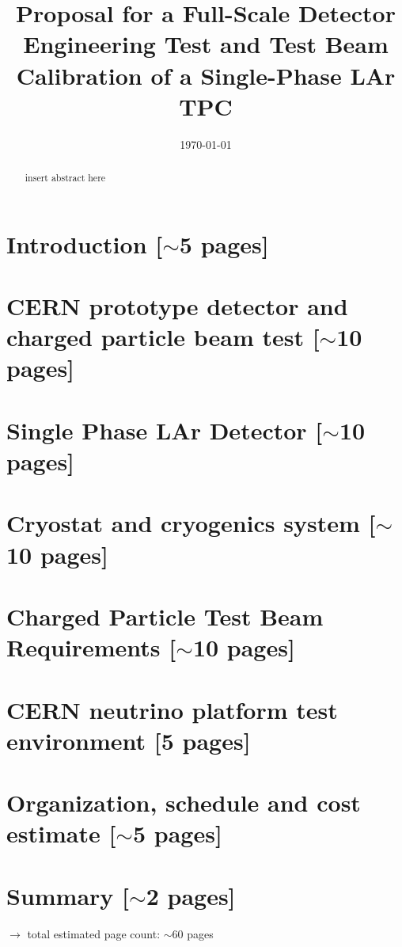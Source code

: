 \documentclass[12pt]{article}
\begin{document}
\title{  Proposal for a Full-Scale Detector Engineering Test and Test Beam Calibration of a Single-Phase LAr TPC}


\date{\today}
	

\maketitle



\begin{abstract}

insert abstract here

\end{abstract}

\newpage
\tableofcontents

\newpage

\section{Introduction [$\sim$5 pages]}
	

\section{CERN prototype detector and charged particle beam test [$\sim$10 pages]}
	
	

\section{Single Phase LAr Detector [$\sim$10 pages]}
	


\section{Cryostat and cryogenics system [$\sim$10 pages]}
	


\section{Charged Particle Test Beam Requirements [$\sim$10 pages]}
	


\section{CERN neutrino platform test environment [5 pages]}
	
	
	
\section{Organization, schedule and cost estimate [$\sim$5 pages]}
	

\section{Summary [$\sim$2 pages]}
	


$\rightarrow$ total estimated page count: $\sim$60 pages
\end{document}
